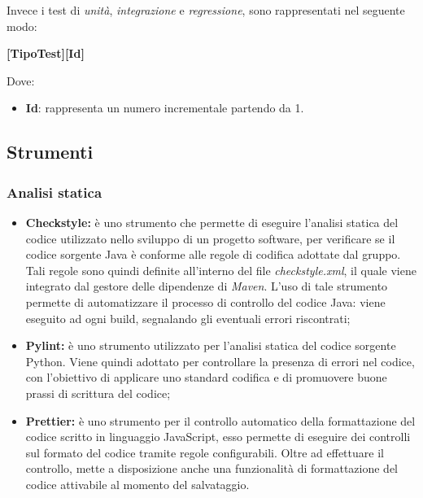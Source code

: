 Invece i test di \textit{unità}, \textit{integrazione} e \textit{regressione}, sono rappresentati nel seguente modo:
\begin{center}
	\textbf{[TipoTest][Id]}
\end{center}
Dove:
\begin{itemize}
	\item \textbf{Id}: rappresenta un numero incrementale partendo da 1.
\end{itemize}

\subsection{Strumenti} \label{ProcessiDiSupportoVerificaStrumenti}
\subsubsection{Analisi statica} \label{ProcessiDiSupportoVerificaStrumentiAnalisiStatica}
\begin{itemize}
	\item \textbf{Checkstyle:} è uno strumento che permette di eseguire l’analisi statica del codice utilizzato nello sviluppo di un progetto software, per verificare se il codice sorgente Java è conforme alle regole di codifica adottate dal gruppo. Tali regole sono quindi definite all’interno del file \textit{checkstyle.xml}, il quale viene integrato dal gestore delle dipendenze di \textit{Maven}. L’uso di tale strumento permette di automatizzare  il processo di controllo del codice Java: viene eseguito ad ogni build, segnalando gli eventuali errori riscontrati; 
	\item \textbf{Pylint:} è uno strumento utilizzato per l’analisi statica del codice sorgente Python. Viene quindi adottato per controllare la presenza di errori nel codice, con l’obiettivo di applicare uno standard codifica e di promuovere buone prassi di scrittura del codice;
	\item \textbf{Prettier:} è uno strumento per il controllo automatico della formattazione del codice scritto in linguaggio JavaScript, esso permette di eseguire dei controlli sul formato del codice tramite regole configurabili.
	Oltre ad effettuare il controllo, mette a disposizione anche una funzionalità di formattazione del codice attivabile al momento del salvataggio.
\end{itemize}
